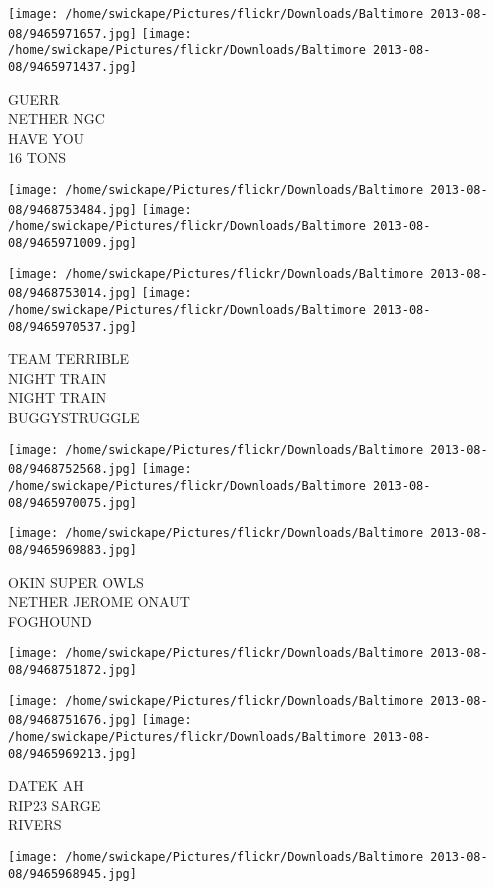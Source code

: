 \documentclass[10pt,letterpaper]{article}
\begin{document}
\texttt{[image: /home/swickape/Pictures/flickr/Downloads/Baltimore 2013-08-08/9465971657.jpg]}
\texttt{[image: /home/swickape/Pictures/flickr/Downloads/Baltimore 2013-08-08/9465971437.jpg]}

GUERR\\
NETHER NGC\\
HAVE YOU\\
16 TONS
\pagebreak

\texttt{[image: /home/swickape/Pictures/flickr/Downloads/Baltimore 2013-08-08/9468753484.jpg]}
\texttt{[image: /home/swickape/Pictures/flickr/Downloads/Baltimore 2013-08-08/9465971009.jpg]}

\texttt{[image: /home/swickape/Pictures/flickr/Downloads/Baltimore 2013-08-08/9468753014.jpg]}
\texttt{[image: /home/swickape/Pictures/flickr/Downloads/Baltimore 2013-08-08/9465970537.jpg]}

TEAM TERRIBLE\\
NIGHT TRAIN\\
NIGHT TRAIN\\
BUGGYSTRUGGLE
\pagebreak

\texttt{[image: /home/swickape/Pictures/flickr/Downloads/Baltimore 2013-08-08/9468752568.jpg]}
\texttt{[image: /home/swickape/Pictures/flickr/Downloads/Baltimore 2013-08-08/9465970075.jpg]}

\texttt{[image: /home/swickape/Pictures/flickr/Downloads/Baltimore 2013-08-08/9465969883.jpg]}

OKIN SUPER OWLS\\
NETHER JEROME ONAUT\\
FOGHOUND
\pagebreak

\texttt{[image: /home/swickape/Pictures/flickr/Downloads/Baltimore 2013-08-08/9468751872.jpg]}

\vspace{0.25in}
\texttt{[image: /home/swickape/Pictures/flickr/Downloads/Baltimore 2013-08-08/9468751676.jpg]}
\texttt{[image: /home/swickape/Pictures/flickr/Downloads/Baltimore 2013-08-08/9465969213.jpg]}

DATEK AH\\
RIP23 SARGE\\
RIVERS
\pagebreak

\texttt{[image: /home/swickape/Pictures/flickr/Downloads/Baltimore 2013-08-08/9465968945.jpg]}
\end{document}
